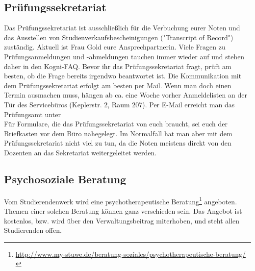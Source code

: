 \subsection*{Prüfungssekretariat}
Das Prüfungssekretariat ist ausschließlich für die Verbuchung eurer Noten und das Ausstellen von Studienverkaufsbescheinigungen ("Transcript of Record") zuständig. Aktuell ist Frau Gold eure Ansprechpartnerin. Viele Fragen zu Prüfungsanmeldungen und -abmeldungen tauchen immer wieder auf und stehen daher in den Kogni-FAQ. Bevor ihr das Prüfungssekretariat fragt, prüft am besten, ob die Frage bereits irgendwo beantwortet ist. Die Kommunikation mit dem Prüfungssekretariat erfolgt am besten per Mail. Wenn man doch einen Termin ausmachen muss, hängen ab ca. eine Woche vorher Anmeldelisten an der Tür des Servicebüros (Keplerstr. 2, Raum 207). Per E-Mail erreicht man das Prüfungsamt unter  \\
Für Formulare, die das Prüfungssekretariat von euch braucht, sei euch der Briefkasten vor dem Büro nahegelegt. Im Normalfall hat man aber mit dem Prüfungssekretariat nicht viel zu tun, da die Noten meistens direkt von den Dozenten an das Sekretariat weitergeleitet werden. 

\subsection*{Psychosoziale Beratung}
Vom Studierendenwerk wird eine psychotherapeutische Beratung\footnote{\url{http://www.my-stuwe.de/beratung-soziales/psychotherapeutische-beratung/}} angeboten. Themen einer solchen Beratung können ganz verschieden sein. Das Angebot ist kostenlos, bzw. wird über den Verwaltungsbeitrag miterhoben, und steht allen Studierenden offen.	%

